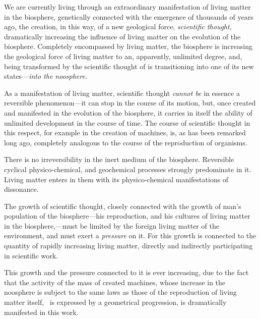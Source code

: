 \Section %
We are currently living through an extraordinary manifestation of living matter
in the biosphere, genetically connected with the emergence of  thousands of years ago, the creation, in this way, of a new geological
force, \emph{scientific thought,} dramatically increasing the influence of
living matter on the evolution of the biosphere.  Completely encompassed by
living matter, the biosphere is increasing the geological force of living
matter to an, apparently, unlimited degree, and, being transformed by the
scientific thought of  is transitioning into one of its new
states---\emph{into the noosphere.}

As a manifestation of living matter, scientific thought \emph{cannot be} in
essence a reversible phenomenon---it can stop in the course of its motion, but,
once created and manifested in the evolution of the biosphere, it carries in
itself the ability of unlimited development in the course of time.  The course
of scientific thought in this respect, for example in the creation of machines,
is, as has been remarked long ago, completely analogous to the course of the
reproduction of organisms.

There is no irreversibility in the inert medium of the biosphere.  Reversible
cyclical physico-chemical, and geochemical processes strongly predominate in
it.  Living matter enters in them with its physico-chemical manifestations of
dissonance.

The growth of scientific thought, closely connected with the growth of man's
population of the biosphere---his reproduction, and his cultures of living
matter in the biosphere,---must be limited by the foreign living matter of the
environment, and must exert a \emph{pressure} on it.  For this growth is
connected to the quantity of rapidly increasing living matter, directly and
indirectly participating in scientific work.

This growth and the pressure connected to it is ever increasing, due to the
fact that the activity of the mass of created machines, whose increase in the
noosphere is subject to the same laws as those of the reproduction of living
matter itself, \ie\ is expressed by a geometrical progression, is dramatically
manifested in this work.

